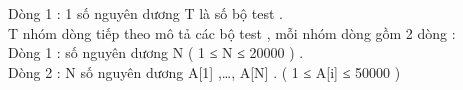 Dòng 1 : 1 số nguyên dương T là số bộ test .   
\\   T nhóm dòng tiếp theo mô tả các bộ test , mỗi nhóm dòng gồm 2 dòng :   
\\   Dòng 1 : số nguyên dương N  ( 1 ≤ N ≤ 20000 )  .   
\\   Dòng 2 : N số nguyên dương A[1] ,…, A[N] . ( 1 ≤ A[i] ≤ 50000 )   
\\

\